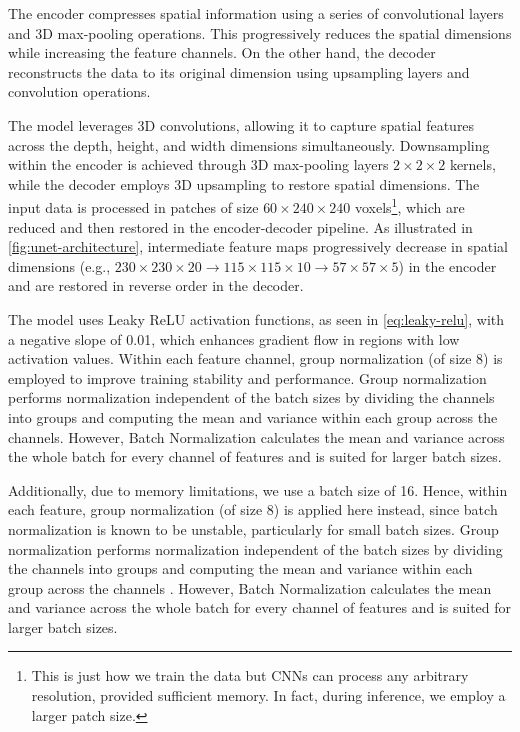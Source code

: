 The encoder compresses spatial information using a series of convolutional layers and 3D max-pooling operations. This progressively reduces the spatial dimensions while increasing the feature channels. On the other hand, the decoder reconstructs the data to its original dimension using upsampling layers and convolution operations. 

The model leverages 3D convolutions, allowing it to capture spatial features across the depth, height, and width dimensions simultaneously. Downsampling within the encoder is achieved through 3D max-pooling layers $2 \times 2 \times 2$ kernels, while the decoder employs 3D upsampling to restore spatial dimensions. The input data is processed in patches of size $60 \times 240 \times 240$ voxels\footnote{This is just how we train the data but \glspl{CNN} can process any arbitrary resolution, provided sufficient memory. In fact, during inference, we employ a larger patch size.}, which are reduced and then restored in the encoder-decoder pipeline. As illustrated in \cref{fig:unet-architecture}, intermediate feature maps progressively decrease in spatial dimensions (e.g., $230 \times 230 \times 20 \to 115 \times 115 \times 10 \to 57 \times 57 \times 5$) in the encoder and are restored in reverse order in the decoder. 

The model uses Leaky ReLU activation functions, as seen in \cref{eq:leaky-relu}, with a negative slope of 0.01, which enhances gradient flow in regions with low activation values. Within each feature channel, group normalization (of size 8) is employed to improve training stability and performance. Group normalization performs normalization independent of the batch sizes by dividing the channels into groups and computing the mean and variance within each group across the channels. However, Batch Normalization calculates the mean and variance across the whole batch for every channel of features and is suited for larger batch sizes.

Additionally, due to memory limitations, we use a batch size of \num{16}. Hence, within each feature, group normalization (of size 8) is applied here instead, since batch normalization is known to be unstable, particularly for small batch sizes. Group normalization performs normalization independent of the batch sizes by dividing the channels into groups and computing the mean and variance within each group across the channels \cite{wuGroupNormalization2018}. However, Batch Normalization calculates the mean and variance across the whole batch for every channel of features and is suited for larger batch sizes.

